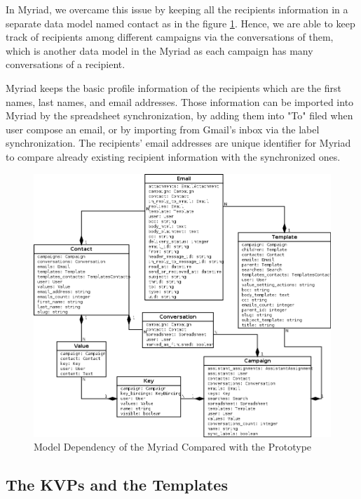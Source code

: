 In Myriad, we overcame this issue by keeping all the recipients information in a separate data model named contact as in the figure \ref{fig:UML_Draw_Final}. Hence, we are able to keep track of recipients among different campaigns via the conversations of them, which is another data model in the Myriad as each campaign has many conversations of a recipient.
\vspace{1cm}

Myriad keeps the basic profile information of the recipients which are the first names, last names, and email addresses. Those information can be imported into Myriad by the spreadsheet synchronization, by adding them into "To" filed when user compose an email, or by importing from Gmail's inbox via the label synchronization. The recipients' email addresses are unique identifier for Myriad to compare already existing recipient information with the synchronized ones. 

\begin{figure}[htbp]
	\centering
	\includegraphics[width=1.00\textwidth]{imgs/UML_Draw_Final.png}
	\caption[Model Dependency of the Myriad Compared with the Prototype]{Model Dependency of the Myriad Compared with the Prototype}
	\label{fig:UML_Draw_Final}
\end{figure}

\subsection{The \ac{KVP}s and the Templates}
\label{subsec:5.3.2:KVPsTemp}

